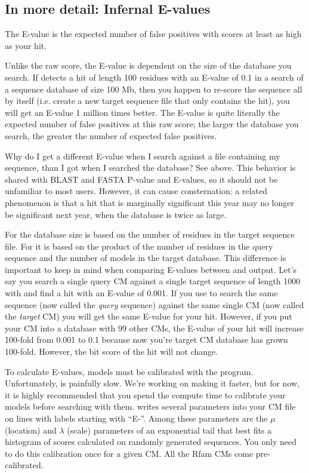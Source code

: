 \subsection{In more detail: Infernal E-values}

The E-value is the expected number of false positives with scores at
least as high as your hit.

Unlike the raw score, the E-value is dependent on the size of the
database you search. If  detects a hit of length 100
residues with an E-value of 0.1 in a search of a sequence database of
size 100 Mb, then you happen to re-score the sequence all by itself
(i.e. create a new target sequence file that only contains the hit),
you will get an E-value 1 million times better. The E-value is quite
literally the expected number of false positives at this raw score;
the larger the database you search, the greater the number of expected
false positives.

\begin{srefaq}{Why do I get a different E-value when I search
against a file containing my sequence, than I got when I searched the
database?} See above. This behavior is shared with BLAST and FASTA
  P-value and E-values, so it should not be unfamiliar to most users.
  However, it can cause consternation: a related phenomenon is that a
hit that is marginally significant this year may no longer be
significant next year, when the database is twice as large. 
\end{srefaq}

For  the database size is based on the number of
residues in the target sequence file. For  it is based on
the product of the number of residues in the query sequence and the number
of models in the target database. This difference is important to keep in mind
when comparing E-values between  and 
output. Let's say you search a single query CM against a single
target sequence of length 1000 with  and find a hit
with an E-value of 0.001. If you use  to search the same
sequence (now called the \emph{query} sequence) against the same
single CM (now called the \emph{target} CM) you will get the same
E-value for your hit. However, if you put your CM into a database with
99 other CMs, the E-value of your hit will increase 100-fold from
0.001 to 0.1 because now you're target CM database has grown
100-fold. However, the bit score of the hit will not
change.

To calculate E-values, models must be calibrated with the
 program. Unfortunately,  is
painfully slow. We're working on making it faster, but for now, it is
highly recommended that you spend the compute time to calibrate your
models before searching with them.   writes several
parameters into your CM file on lines with labels starting with
``E-''. Among these parameters are the $\mu$ (location) and $\lambda$
(scale) parameters of an exponential tail that best fits a histogram
of scores calculated on randomly generated sequences. You only need to
do this calibration once for a given CM. All the Rfam CMs come
pre-calibrated.

